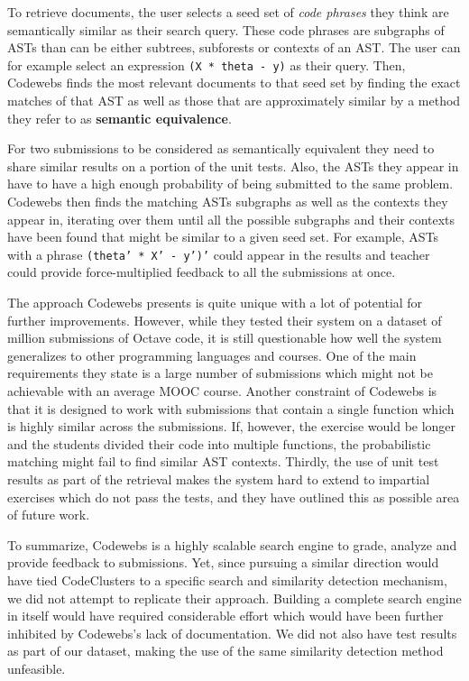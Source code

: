 To retrieve documents, the user selects a seed set of \textit{code phrases} they think are semantically similar as their search query. These code phrases are subgraphs of ASTs than can be either subtrees, subforests or contexts of an AST. The user can for example select an expression \texttt{(X * theta - y)} as their query. Then, Codewebs finds the most relevant documents to that seed set by finding the exact matches of that AST as well as those that are approximately similar by a method they refer to as \textbf{semantic equivalence}.

For two submissions to be considered as semantically equivalent they need to share similar results on a portion of the unit tests. Also, the ASTs they appear in have to have a high enough probability of being submitted to the same problem. Codewebs then finds the matching ASTs subgraphs as well as the contexts they appear in, iterating over them until all the possible subgraphs and their contexts have been found that might be similar to a given seed set. For example, ASTs with a phrase \texttt{(theta' * X' - y')'} could appear in the results and teacher could provide force-multiplied feedback to all the submissions at once.

The approach Codewebs presents is quite unique with a lot of potential for further improvements. However, while they tested their system on a dataset of million submissions of Octave code, it is still questionable how well the system generalizes to other programming languages and courses. One of the main requirements they state is a large number of submissions which might not be achievable with an average MOOC course. Another constraint of Codewebs is that it is designed to work with submissions that contain a single function which is highly similar across the submissions. If, however, the exercise would be longer and the students divided their code into multiple functions, the probabilistic matching might fail to find similar AST contexts. Thirdly, the use of unit test results as part of the retrieval makes the system hard to extend to impartial exercises which do not pass the tests, and they have outlined this as possible area of future work.

To summarize, Codewebs is a highly scalable search engine to grade, analyze and provide feedback to submissions. Yet, since pursuing a similar direction would have tied CodeClusters to a specific search and similarity detection mechanism, we did not attempt to replicate their approach. Building a complete search engine in itself would have required considerable effort which would have been further inhibited by Codewebs's lack of documentation. We did not also have test results as part of our dataset, making the use of the same similarity detection method unfeasible.

